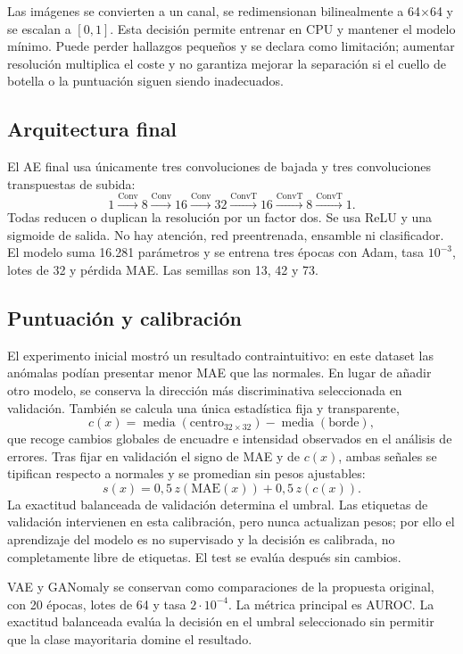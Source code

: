 \documentclass[10pt,a4paper,twocolumn]{article}
\begin{document}
Las imágenes se convierten a un canal, se redimensionan bilinealmente a
64$\times$64 y se escalan a $[0,1]$. Esta decisión permite entrenar en CPU y
mantener el modelo mínimo. Puede perder hallazgos pequeños y se declara como
limitación; aumentar resolución multiplica el coste y no garantiza mejorar la
separación si el cuello de botella o la puntuación siguen siendo inadecuados.

\subsection{Arquitectura final}

El AE final usa únicamente tres convoluciones de bajada y tres convoluciones
transpuestas de subida:
\[
1\xrightarrow{\mathrm{Conv}}8\xrightarrow{\mathrm{Conv}}16
\xrightarrow{\mathrm{Conv}}32\xrightarrow{\mathrm{ConvT}}16
\xrightarrow{\mathrm{ConvT}}8\xrightarrow{\mathrm{ConvT}}1.
\]
Todas reducen o duplican la resolución por un factor dos. Se usa ReLU y una
sigmoide de salida. No hay atención, red preentrenada, ensamble ni
clasificador. El modelo suma 16.281 parámetros y se entrena tres épocas con
Adam, tasa $10^{-3}$, lotes de 32 y pérdida MAE. Las semillas son 13, 42 y 73.

\subsection{Puntuación y calibración}

El experimento inicial mostró un resultado contraintuitivo: en este dataset las
anómalas podían presentar menor MAE que las normales. En lugar de añadir otro
modelo, se conserva la dirección más discriminativa seleccionada en validación.
También se calcula una única estadística fija y transparente,
\[
 c(x)=\operatorname{media}(\text{centro}_{32\times32})-
      \operatorname{media}(\text{borde}),
\]
que recoge cambios globales de encuadre e intensidad observados en el análisis
de errores. Tras fijar en validación el signo de MAE y de $c(x)$, ambas señales
se tipifican respecto a normales y se promedian sin pesos ajustables:
\[
 s(x)=0{,}5\,z(\mathrm{MAE}(x))+0{,}5\,z(c(x)).
\]
La exactitud balanceada de validación determina el umbral. Las etiquetas de
validación intervienen en esta calibración, pero nunca actualizan pesos; por
ello el aprendizaje del modelo es no supervisado y la decisión es calibrada,
no completamente libre de etiquetas. El test se evalúa después sin cambios.

VAE y GANomaly se conservan como comparaciones de la propuesta original, con
20 épocas, lotes de 64 y tasa $2\cdot10^{-4}$. La métrica principal es AUROC.
La exactitud balanceada evalúa la decisión en el umbral seleccionado sin
permitir que la clase mayoritaria domine el resultado.
\end{document}
